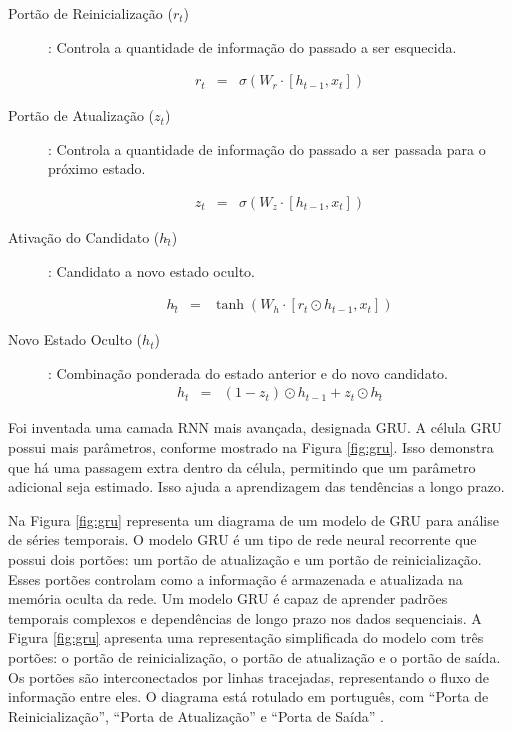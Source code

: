 \begin{description}
	\item[Portão de Reinicialização (\(r_t\))]: Controla a quantidade de informação do passado a ser esquecida.
	
 \begin{eqnarray}
 	r_t &=& \sigma(W_r \cdot [h_{t-1}, x_t])\label{eq:gru}
 \end{eqnarray} 

\item[Portão de Atualização (\(z_t\))]: Controla a quantidade de informação do passado a ser passada para o próximo estado.

 \begin{eqnarray}
 	z_t &=& \sigma(W_z \cdot [h_{t-1}, x_t])\label{eq:gru1}
 \end{eqnarray}

\item[Ativação do Candidato (\(h\widetilde{_t}\))]: Candidato a novo estado oculto.

\begin{eqnarray}
	h\widetilde{_t} &=& \tanh\left(W_h \cdot [r_t \odot h_{t-1}, x_t]\right)\label{eq:gru2}
\end{eqnarray}

\item[Novo Estado Oculto (\(h_t\))]: Combinação ponderada do estado anterior e do novo candidato.
\begin{eqnarray}
	h_t &=& (1 - z_t) \odot h_{t-1} + z_t \odot h\widetilde{_t}\label{eq:gru3}
\end{eqnarray}
\end{description}





Foi inventada uma camada RNN mais avançada, designada GRU. A célula GRU possui mais parâmetros, conforme mostrado na Figura \ref{fig:gru}. Isso demonstra que há uma passagem extra dentro da célula, permitindo que um parâmetro adicional seja estimado. Isso ajuda a aprendizagem das tendências a longo prazo.

Na Figura \ref{fig:gru} representa um diagrama de um modelo de GRU para análise de séries temporais. O modelo GRU é um tipo de rede neural recorrente que possui dois portões: um portão de atualização e um portão de reinicialização. Esses portões controlam como a informação é armazenada e atualizada na memória oculta da rede. Um modelo GRU é capaz de aprender padrões temporais complexos e dependências de longo prazo nos dados sequenciais. A Figura \ref{fig:gru} apresenta uma representação simplificada do modelo com três portões: o portão de reinicialização, o portão de atualização e o portão de saída. Os portões são interconectados por linhas tracejadas, representando o fluxo de informação entre eles. O diagrama está rotulado em português, com ``Porta de Reinicialização'', ``Porta de Atualização'' e ``Porta de Saída'' \cite{Saranya2020, Jordan2021, Khan2022}.

